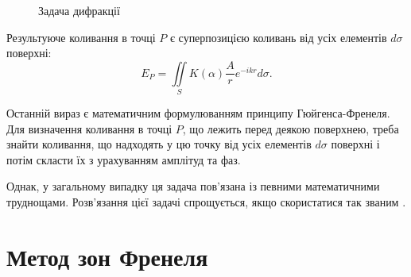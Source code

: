 \begin{figure}[h!]
    \centering
    \caption{Задача дифракції}
    \label{pic:Diffraction1}
\end{figure}

Результуюче коливання в точці $ P $ є суперпозицією коливань від усіх елементів $ d\sigma $ поверхні:
\begin{equation}\label{eq:E_p}
    E_P = \iint\limits_{S}K(\alpha) \frac{A}{r} e^{-i k r}  d\sigma .
\end{equation}

Останній вираз є математичним формулюванням принципу Гюйгенса-Френеля. Для визначення коливання в точці $ P $, що лежить перед деякою поверхнею, треба знайти коливання, що надходять у цю точку від усіх елементів $ d\sigma $ поверхні і потім скласти їх з урахуванням амплітуд та фаз.

Однак, у загальному випадку ця задача пов'язана із певними математичними труднощами. Розв'язання цієї задачі спрощується, якщо
скористатися так званим .





\section{Метод зон Френеля}




